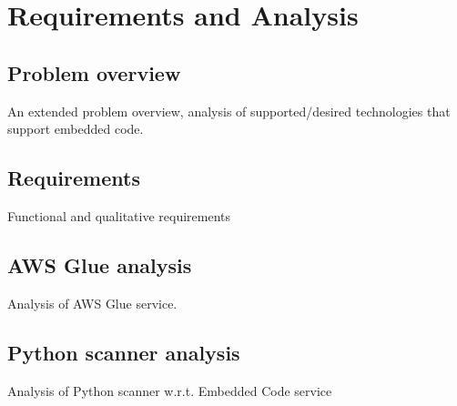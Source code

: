 \chapter{Requirements and Analysis}

\section{Problem overview}
An extended problem overview, analysis of supported/desired technologies that support embedded code.

\section{Requirements}
Functional and qualitative requirements

\section{AWS Glue analysis}
Analysis of AWS Glue service.

\section{Python scanner analysis}
Analysis of Python scanner w.r.t. Embedded Code service
